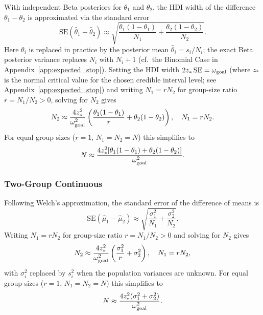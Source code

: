 With independent Beta posteriors for $\theta_1$ and $\theta_2$, the HDI width of
the difference $\theta_1 - \theta_2$ is approximated via the standard error
\begin{equation}\label{eq:se_diff_binomial}
    \text{SE}(\hat\theta_1 - \hat\theta_2) \approx
    \sqrt{\frac{\theta_1(1-\theta_1)}{N_1} + \frac{\theta_2(1-\theta_2)}{N_2}}.
\end{equation}
Here $\theta_i$ is replaced in practice by the posterior mean $\hat\theta_i = s_i/N_i$;
the exact Beta posterior variance replaces $N_i$ with $N_i+1$ (cf.\ the Binomial Case
in Appendix~\ref{app:expected_stop}).
Setting the HDI width $2z_*\,\text{SE} = \omega_{\rm goal}$ (where $z_*$ is the
normal critical value for the chosen credible interval level;
see Appendix~\ref{app:expected_stop}) and writing
$N_1 = rN_2$ for group-size ratio $r = N_1/N_2 > 0$, solving for $N_2$ gives
\begin{equation}\label{eq:ngoal_two_group_binomial}
    N_2 \approx \frac{4 z_{*}^{2}}{\omega_{\rm goal}^{2}}
        \left(\frac{\theta_1(1-\theta_1)}{r} + \theta_2(1-\theta_2)\right),
    \quad N_1 = r N_2.
\end{equation}
For equal group sizes ($r=1$, $N_1=N_2=N$) this simplifies to
\begin{equation}\label{eq:ngoal_two_group_binomial_equal}
    N \approx \frac{4 z_{*}^{2}[\theta_1(1-\theta_1)+\theta_2(1-\theta_2)]}{\omega_{\rm goal}^{2}}.
\end{equation}

\subsubsection*{Two-Group Continuous}

Following Welch's approximation, the standard error of the difference of means is
\begin{equation}\label{eq:se_diff_continuous}
    \text{SE}(\hat\mu_1 - \hat\mu_2) \approx
    \sqrt{\frac{\sigma_1^2}{N_1} + \frac{\sigma_2^2}{N_2}}.
\end{equation}
Writing $N_1 = rN_2$ for group-size ratio $r = N_1/N_2 > 0$ and solving for $N_2$ gives
\begin{equation}\label{eq:ngoal_two_group_continuous}
    N_2 \approx \frac{4 z_{*}^{2}}{\omega_{\rm goal}^{2}}
        \left(\frac{\sigma_1^2}{r} + \sigma_2^2\right),
    \quad N_1 = r N_2,
\end{equation}
with $\sigma_i^2$ replaced by $s_i^2$ when the population variances are unknown.
For equal group sizes ($r=1$, $N_1=N_2=N$) this simplifies to
\begin{equation}\label{eq:ngoal_two_group_continuous_equal}
    N \approx \frac{4 z_{*}^{2}(\sigma_1^2+\sigma_2^2)}{\omega_{\rm goal}^{2}}.
\end{equation}
